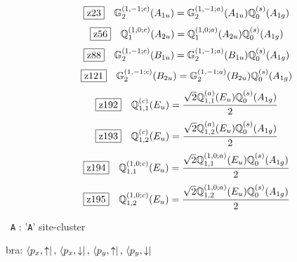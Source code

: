 \documentclass[fleqn,10pt,landscape]{jsarticle}
\begin{document}
\begin{dmath*}
\hspace*{3mm}\fbox{z23}\quad \mathbb{G}_{2}^{(1,-1;c)}(A_{1u})=\mathbb{G}_{2}^{(1,-1;a)}(A_{1u}) \mathbb{Q}_{0}^{(s)}(A_{1g})
\end{dmath*}
\begin{dmath*}
\hspace*{3mm}\fbox{z56}\quad \mathbb{Q}_{1}^{(1,0;c)}(A_{2u})=\mathbb{Q}_{1}^{(1,0;a)}(A_{2u}) \mathbb{Q}_{0}^{(s)}(A_{1g})
\end{dmath*}
\begin{dmath*}
\hspace*{3mm}\fbox{z88}\quad \mathbb{G}_{2}^{(1,-1;c)}(B_{1u})=\mathbb{G}_{2}^{(1,-1;a)}(B_{1u}) \mathbb{Q}_{0}^{(s)}(A_{1g})
\end{dmath*}
\begin{dmath*}
\hspace*{3mm}\fbox{z121}\quad \mathbb{G}_{2}^{(1,-1;c)}(B_{2u})=\mathbb{G}_{2}^{(1,-1;a)}(B_{2u}) \mathbb{Q}_{0}^{(s)}(A_{1g})
\end{dmath*}
\begin{dmath*}
\hspace*{3mm}\fbox{z192}\quad \mathbb{Q}_{1,1}^{(c)}(E_{u})=\frac{\sqrt{2} \mathbb{Q}_{1,1}^{(a)}(E_{u}) \mathbb{Q}_{0}^{(s)}(A_{1g})}{2}
\end{dmath*}
\begin{dmath*}
\hspace*{3mm}\fbox{z193}\quad \mathbb{Q}_{1,2}^{(c)}(E_{u})=\frac{\sqrt{2} \mathbb{Q}_{1,2}^{(a)}(E_{u}) \mathbb{Q}_{0}^{(s)}(A_{1g})}{2}
\end{dmath*}
\begin{dmath*}
\hspace*{3mm}\fbox{z194}\quad \mathbb{Q}_{1,1}^{(1,0;c)}(E_{u})=\frac{\sqrt{2} \mathbb{Q}_{1,1}^{(1,0;a)}(E_{u}) \mathbb{Q}_{0}^{(s)}(A_{1g})}{2}
\end{dmath*}
\begin{dmath*}
\hspace*{3mm}\fbox{z195}\quad \mathbb{Q}_{1,2}^{(1,0;c)}(E_{u})=\frac{\sqrt{2} \mathbb{Q}_{1,2}^{(1,0;a)}(E_{u}) \mathbb{Q}_{0}^{(s)}(A_{1g})}{2}
\end{dmath*}
\vspace{5mm}

\noindent\textbullet\, \texttt{A} : '\texttt{A}' site-cluster

\noindent\quad * bra: $\bra{p_{x},\uparrow},\, \bra{p_{x},\downarrow},\, \bra{p_{y},\uparrow},\, \bra{p_{y},\downarrow}$
\end{document}
